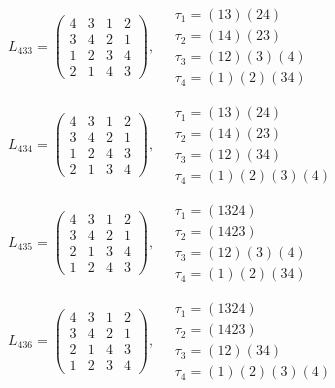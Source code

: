 $L_{433} = \begin{pmatrix} 4 & 3 & 1 & 2 \\ 3 & 4 & 2 & 1 \\ 1 & 2 & 3 & 4 \\ 2 & 1 & 4 & 3 \end{pmatrix}, \quad \begin{matrix} \tau_{1} = (1 3)(2 4) \\ \tau_{2} = (1 4)(2 3) \\ \tau_{3} = (1 2)(3)(4) \\ \tau_{4} = (1)(2)(3 4) \end{matrix}$

$L_{434} = \begin{pmatrix} 4 & 3 & 1 & 2 \\ 3 & 4 & 2 & 1 \\ 1 & 2 & 4 & 3 \\ 2 & 1 & 3 & 4 \end{pmatrix}, \quad \begin{matrix} \tau_{1} = (1 3)(2 4) \\ \tau_{2} = (1 4)(2 3) \\ \tau_{3} = (1 2)(3 4) \\ \tau_{4} = (1)(2)(3)(4) \end{matrix}$

$L_{435} = \begin{pmatrix} 4 & 3 & 1 & 2 \\ 3 & 4 & 2 & 1 \\ 2 & 1 & 3 & 4 \\ 1 & 2 & 4 & 3 \end{pmatrix}, \quad \begin{matrix} \tau_{1} = (1 3 2 4) \\ \tau_{2} = (1 4 2 3) \\ \tau_{3} = (1 2)(3)(4) \\ \tau_{4} = (1)(2)(3 4) \end{matrix}$

$L_{436} = \begin{pmatrix} 4 & 3 & 1 & 2 \\ 3 & 4 & 2 & 1 \\ 2 & 1 & 4 & 3 \\ 1 & 2 & 3 & 4 \end{pmatrix}, \quad \begin{matrix} \tau_{1} = (1 3 2 4) \\ \tau_{2} = (1 4 2 3) \\ \tau_{3} = (1 2)(3 4) \\ \tau_{4} = (1)(2)(3)(4) \end{matrix}$

